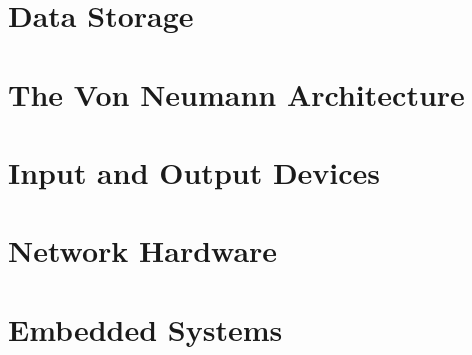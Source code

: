 \documentclass[../main.tex]{subfiles}
\begin{document}
\section{Data Storage}
\label{3:sec:data_storage}



\section{The Von Neumann Architecture}
\label{3:sec:von_neumann}


\section{Input and Output Devices}
\label{3:sec:input_and_output_devices}


\section{Network Hardware}
\label{3:sec:network_hardware}


\section{Embedded Systems}

\end{document}

